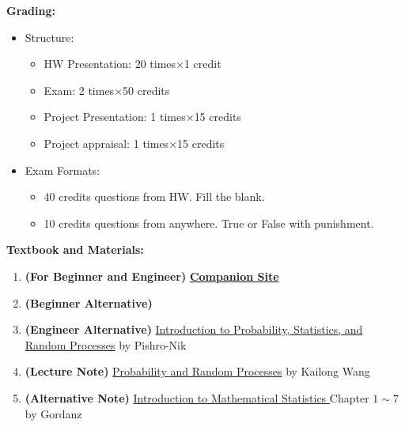 \documentclass{article}
\theoremstyle{definition}
\theoremstyle{remark}
\begin{document}
\textbf{Grading:} {
    \begin{itemize}
        \item Structure: {
            \begin{itemize}
                \item HW Presentation: 20 times$\times$1 credit
                \item Exam: 2 times$\times$50 credits
                \item Project Presentation: 1 times$\times$15 credits
                \item Project appraisal: 1 times$\times$15 credits
            \end{itemize}
        }
        \item Exam Formats: {
            \begin{itemize}
                \item 40 credits questions from HW. Fill the blank.
                \item 10 credits questions from anywhere. True or False with punishment.
            \end{itemize}
        }
    \end{itemize}
}

\textbf{Textbook and Materials:} {
    \begin{enumerate}
        \item \textbf{(For Beginner and Engineer)} \label{book:Yates_Goodman_2015}
        \href{https://bcs.wiley.com/he-bcs/Books?action=index&itemId=1118324560&bcsId=8677}{\textbf{Companion Site}}
        \item \textbf{(Beginner Alternative)} 
        \item \textbf{(Engineer Alternative)} \href{https://www.probabilitycourse.com/}{Introduction to Probability, Statistics, and Random Processes} by Pishro-Nik
        \item \textbf{(Lecture Note)} \href{https://github.com/kwang0913/MyLatex/blob/main/2023ECE226Note/main.pdf}{Probability and Random Processes} by Kailong Wang
        \item \textbf{(Alternative Note)} \href{https://web.ma.utexas.edu/users/gordanz/lecture_notes_page.html}{Introduction to Mathematical Statistics
        } Chapter $1\sim7$ by Gordanz
    \end{enumerate}
}
\end{document}
